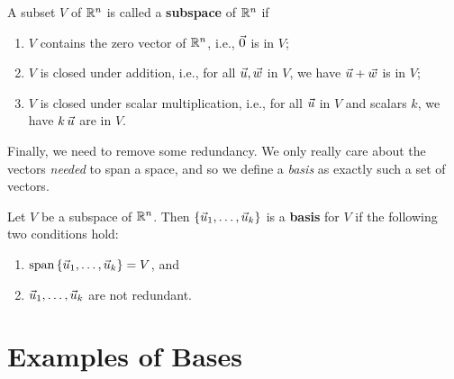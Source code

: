 \documentclass{ximera}
\begin{document}
\begin{definition}

  A subset $V$ of $\mathbb{R}^n$ is called a \textbf{subspace}%
  of $\mathbb{R}^n$ if
  \begin{enumerate}
  \item $V$ contains the zero vector of $\mathbb{R}^n$, i.e., $\vec{0}$ is in $V$;
  \item $V$ is closed under addition, i.e., for all
    $\vec{u},\vec{w}$ in $V$, we have $\vec{u}+\vec{w}$ is in $V$;
  \item $V$ is closed under scalar multiplication, i.e., for all
    $\vec{u}$ in $V$ and scalars $k$, we have $k\,\vec{u}$ are in $V$.
  \end{enumerate}
\end{definition}

Finally, we need to remove some redundancy. We only really care about the vectors \emph{needed} to span a space, and so we define a \emph{basis} as exactly such a set of vectors.

\begin{definition}

  Let $V$ be a subspace of\/ $\mathbb{R}^n$. Then
  $\left\{\vec{u}_1,\ldots,\vec{u}_k\right\}$ is a \textbf{basis} for
  $V$ if the following two conditions hold:%
  \begin{enumerate}
  \item $\text{span}\left\{\vec{u}_1,\ldots,\vec{u}_k\right\}=V$, and
  \item $\vec{u}_1,\ldots,\vec{u}_k$ are not redundant.
  \end{enumerate}
\end{definition}





\section*{Examples of Bases}
\end{document}
